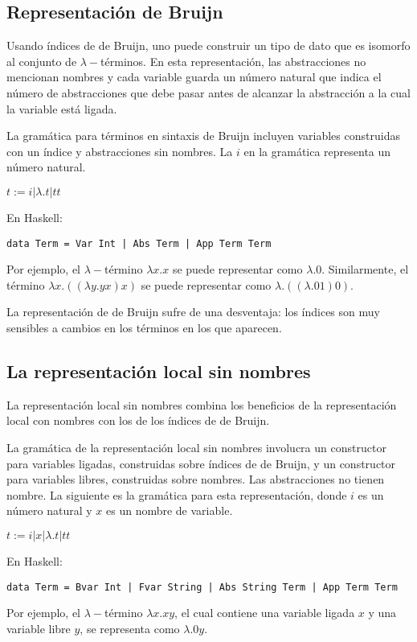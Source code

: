 \documentclass{article}
\begin{document}
\subsection{Representación de Bruijn}

Usando índices de de Bruijn, uno puede construir un tipo de dato que es isomorfo al conjunto de $\lambda-$términos. En esta representación, las abstracciones no mencionan nombres y cada variable guarda un número natural que indica el número de abstracciones que debe pasar antes de alcanzar la abstracción a la cual la variable está ligada.

La gramática para términos en sintaxis de Bruijn incluyen variables construidas con un índice y abstracciones sin nombres. La $i$ en la gramática representa un número natural.

$t := i | \lambda.t | t t$

En Haskell:

\texttt{data Term = Var Int | Abs Term | App Term Term}

Por ejemplo, el $\lambda-$término $\lambda x . x$ se puede representar como $\lambda . 0$. Similarmente, el término $\lambda x . ((\lambda y . y x ) x )$ se puede representar como $\lambda . (( \lambda. 0 1)0)$.

La representación de de Bruijn sufre de una desventaja: los índices son muy sensibles a cambios en los términos en los que aparecen.

\subsection{La representación local sin nombres}

La representación local sin nombres combina los beneficios de la representación local con nombres con los de los índices de de Bruijn.

La gramática de la representación local sin nombres involucra un constructor para variables ligadas, construidas sobre índices de de Bruijn, y un constructor para variables libres, construidas sobre nombres. Las abstracciones no tienen nombre. La siguiente es la gramática para esta representación, donde $i$ es un número natural y $x$ es un nombre de variable.

$t := i | x | \lambda . t | t t$

En Haskell:

\texttt{data Term = Bvar Int | Fvar String | Abs String Term | App Term Term}

Por ejemplo, el $\lambda-$término $\lambda x. x y$, el cual contiene una variable ligada $x$ y una variable libre $y$, se representa como $\lambda . 0 y$.
\end{document}
